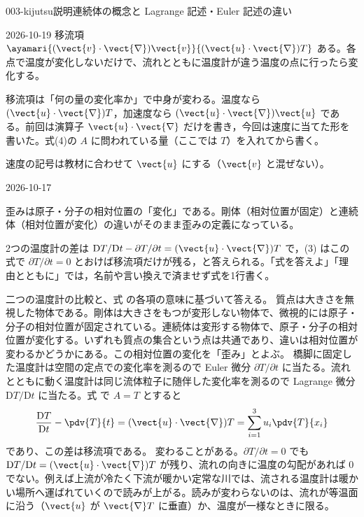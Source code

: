 \documentclass[uplatex,dvipdfmx,a4paper,11pt]{jsarticle}
\begin{document}
\begin{mondai}{003-kijutsu}{説明}{連続体の概念と Lagrange 記述・Euler 記述の違い}
\begin{kotaeutsushi}{2026-10-19}
移流項　$\ayamari{(\vect{v}\cdot\vect{\nabla})\vect{v}}{(\vect{u}\cdot\vect{\nabla})T}$
ある。各点で温度が変化しないだけで、流れとともに温度計が違う温度の点に行ったら変化する。
\end{kotaeutsushi}
\begin{kizuki}
\item {}移流項は「何の量の変化率か」で中身が変わる。温度なら $(\vect{u}\cdot\vect{\nabla})T$，加速度なら $(\vect{u}\cdot\vect{\nabla})\vect{u}$ である。前回は演算子 $\vect{u}\cdot\vect{\nabla}$ だけを書き，今回は速度に当てた形を書いた。式(4)の $A$ に問われている量（ここでは $T$）を入れてから書く。
\item 速度の記号は教材に合わせて $\vect{u}$ にする（$\vect{v}$ と混ぜない）。
\end{kizuki}
\begin{maekizuki}{2026-10-17}
\item 歪みは原子・分子の相対位置の「変化」である。剛体（相対位置が固定）と連続体（相対位置が変化）の違いがそのまま歪みの定義になっている。
\item 2つの温度計の差は $\mathrm{D}T/\mathrm{D}t-\partial T/\partial t=(\vect{u}\cdot\vect{\nabla})T$ で，(3) はこの式で $\partial T/\partial t=0$ とおけば移流項だけが残る，と答えられる。「式を答えよ」「理由とともに」では，名前や言い換えで済ませず式を1行書く。
\end{maekizuki}
\begin{tadashii}
\houshin 二つの温度計の比較と、式  の各項の意味に基づいて答える。 %
\keisan {} 質点は大きさを無視した物体である。剛体は大きさをもつが変形しない物体で、微視的には原子・分子の相対位置が固定されている。連続体は変形する物体で、原子・分子の相対位置が変化する。いずれも質点の集合という点は共通であり、違いは相対位置が変わるかどうかにある。この相対位置の変化を「歪み」とよぶ。
 橋脚に固定した温度計は空間の定点での変化率を測るので Euler 微分 $\partial T/\partial t$ に当たる。流れとともに動く温度計は同じ流体粒子に随伴した変化率を測るので Lagrange 微分 $\mathrm{D}T/\mathrm{D}t$ に当たる。式  で $A = T$ とすると
\[ \frac{\mathrm{D}T}{\mathrm{D}t} - \pdv{T}{t} = (\vect{u}\cdot\vect{\nabla})T = \sum_{i=1}^{3} u_i\pdv{T}{x_i} \]
であり、この差は移流項である。
 変わることがある。$\partial T/\partial t = 0$ でも $\mathrm{D}T/\mathrm{D}t = (\vect{u}\cdot\vect{\nabla})T$ が残り、流れの向きに温度の勾配があれば 0 でない。例えば上流が冷たく下流が暖かい定常な川では、流される温度計は暖かい場所へ運ばれていくので読みが上がる。読みが変わらないのは、流れが等温面に沿う（$\vect{u}$ が $\vect{\nabla}T$ に垂直）か、温度が一様なときに限る。

\end{tadashii}
\end{mondai}
\end{document}

